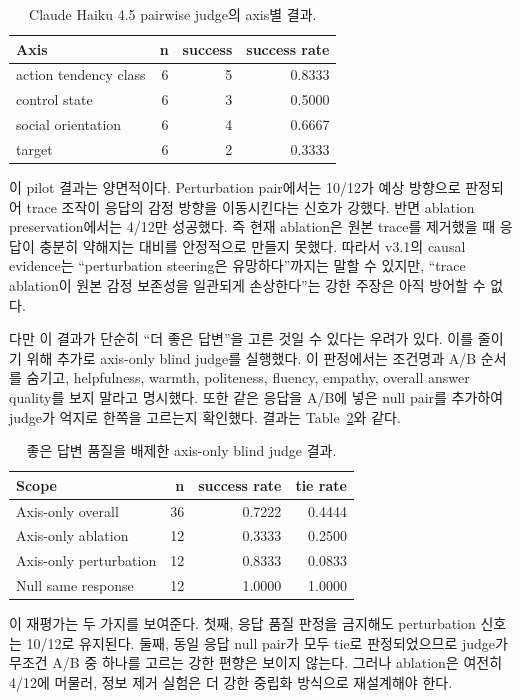 \documentclass[11pt,a4paper]{article}
\begin{document}
\begin{table}[h]
\centering
\small
\begin{tabular}{lrrr}
\toprule
Axis & n & success & success rate \\
\midrule
action tendency class & 6 & 5 & 0.8333 \\
control state & 6 & 3 & 0.5000 \\
social orientation & 6 & 4 & 0.6667 \\
target & 6 & 2 & 0.3333 \\
\bottomrule
\end{tabular}
\caption{Claude Haiku 4.5 pairwise judge의 axis별 결과.}
\label{tab:causal-axis}
\end{table}

이 pilot 결과는 양면적이다. Perturbation pair에서는 10/12가 예상 방향으로 판정되어 trace 조작이 응답의 감정 방향을 이동시킨다는 신호가 강했다. 반면 ablation preservation에서는 4/12만 성공했다. 즉 현재 ablation은 원본 trace를 제거했을 때 응답이 충분히 약해지는 대비를 안정적으로 만들지 못했다. 따라서 v3.1의 causal evidence는 ``perturbation steering은 유망하다''까지는 말할 수 있지만, ``trace ablation이 원본 감정 보존성을 일관되게 손상한다''는 강한 주장은 아직 방어할 수 없다.

다만 이 결과가 단순히 ``더 좋은 답변''을 고른 것일 수 있다는 우려가 있다. 이를 줄이기 위해 추가로 axis-only blind judge를 실행했다. 이 판정에서는 조건명과 A/B 순서를 숨기고, helpfulness, warmth, politeness, fluency, empathy, overall answer quality를 보지 말라고 명시했다. 또한 같은 응답을 A/B에 넣은 null pair를 추가하여 judge가 억지로 한쪽을 고르는지 확인했다. 결과는 Table~\ref{tab:axis-blind}와 같다.

\begin{table}[h]
\centering
\small
\begin{tabular}{lrrr}
\toprule
Scope & n & success rate & tie rate \\
\midrule
Axis-only overall & 36 & 0.7222 & 0.4444 \\
Axis-only ablation & 12 & 0.3333 & 0.2500 \\
Axis-only perturbation & 12 & 0.8333 & 0.0833 \\
Null same response & 12 & 1.0000 & 1.0000 \\
\bottomrule
\end{tabular}
\caption{좋은 답변 품질을 배제한 axis-only blind judge 결과.}
\label{tab:axis-blind}
\end{table}

이 재평가는 두 가지를 보여준다. 첫째, 응답 품질 판정을 금지해도 perturbation 신호는 10/12로 유지된다. 둘째, 동일 응답 null pair가 모두 tie로 판정되었으므로 judge가 무조건 A/B 중 하나를 고르는 강한 편향은 보이지 않는다. 그러나 ablation은 여전히 4/12에 머물러, 정보 제거 실험은 더 강한 중립화 방식으로 재설계해야 한다.
\end{document}
